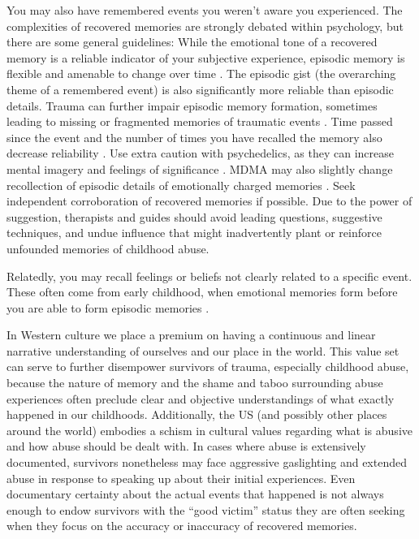 \documentclass[12pt,letterpaper]{article}
\begin{document}
You may also have remembered events you weren't aware you experienced. The complexities of recovered memories are strongly debated within psychology, but there are some general guidelines: While the emotional tone of a recovered memory is a reliable indicator of your subjective experience, episodic memory is flexible and amenable to change over time \cite{reynaFuzzyTrace}. The episodic gist (the overarching theme of a remembered event) is also significantly more reliable than episodic details. Trauma can further impair episodic memory formation, sometimes leading to missing or fragmented memories of traumatic events \cite{vanderKolkBody}. Time passed since the event and the number of times you have recalled the memory also decrease reliability \cite{laneReconsolidation}. Use extra caution with psychedelics, as they can increase mental imagery and feelings of significance \cite{griffithsSignificance,araujoImagery}. MDMA may also slightly change recollection of episodic details of emotionally charged memories \cite{dossRecollection}. Seek independent corroboration of recovered memories if possible. Due to the power of suggestion, therapists and guides should avoid leading questions, suggestive techniques, and undue influence that might inadvertently plant or reinforce unfounded memories of childhood abuse.

Relatedly, you may recall feelings or beliefs not clearly related to a specific event. These often come from early childhood, when emotional memories form before you are able to form episodic memories \cite{brownAttachmentDisturbances}.

In Western  culture we place a premium on having a continuous and linear narrative understanding of ourselves and our place in the world. This value set can serve to further disempower survivors of trauma, especially childhood abuse, because the nature of memory and the shame and taboo surrounding abuse experiences often preclude clear and objective understandings of what exactly happened in our childhoods.  Additionally, the US (and possibly other places around the world) embodies a schism in cultural values regarding what is abusive and how abuse should be dealt with. In cases where abuse is extensively documented, survivors nonetheless may face aggressive gaslighting and extended abuse in response to speaking up about their initial experiences. Even documentary certainty about the actual events that happened is not always enough to endow survivors with the “good victim” status they are often seeking when they focus on the accuracy or inaccuracy of recovered memories.
\end{document}

